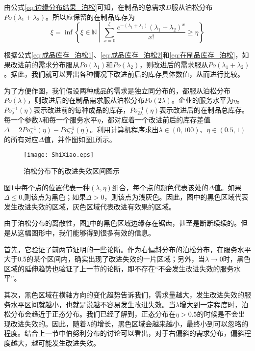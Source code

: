 由公式\ref{eq:边缘分布结果_泊松}可知，在制品的总需求$D$服从泊松分布$Po(\lambda_1+\lambda_2)$。所以应保留的在制品库存为
\begin{equation}
\xi = \inf\left\{\xi\in\mathbb{N}\middle|\sum_{x=0}^{\xi}\frac{e^{-(\lambda_1+\lambda_2)}(\lambda_1+\lambda_2)^x}{x!}\geq \eta\right\}
\label{eq:在制品库存_泊松}
\end{equation}

根据公式\ref{eq:成品库存_泊松1}、\ref{eq:成品库存_泊松2}和\ref{eq:在制品库存_泊松}，如果改进前的需求分布服从$Po(\lambda_1)$和$Po(\lambda_2)$，则改进后的需求服从$Po(\lambda_1+\lambda_2)$。据此，我们就可以算出各种情况下改进前后的库存具体数值，从而进行比较。

为了方便作图，我们假设两种成品的需求是独立同分布的，都服从泊松分布$Po(\lambda)$，则改进后的在制品需求服从泊松分布$Po(2\lambda)$。企业的服务水平为$\eta$。$Po^{-1}_{\lambda}(\eta)$表示改进前的每种成品的库存，$Po^{-1}_{2\lambda}(\eta)$表示改进后的在制品总库存。每一个参数$\lambda$和每一个服务水平$\eta$，都对应着一个改进前后的库存差值$\Delta=2Po^{-1}_{\lambda}(\eta)-Po^{-1}_{2\lambda}(\eta)$。利用计算机程序求出$\lambda\in(0,100)$、$\eta\in(0.5,1)$的所有对应$\Delta$值，并作图如图\ref{fig:泊松分布下的改进失效区间图示}所示。

\begin{figure}[htb]
\centering
\texttt{[image: ShiXiao.eps]}
\caption{泊松分布下的改进失效区间图示}
\label{fig:泊松分布下的改进失效区间图示}
\end{figure}

图\ref{fig:泊松分布下的改进失效区间图示}中每个点的位置代表一种$(\lambda,\eta)$组合，每个点的颜色代表该处的$\Delta$值。如果$\Delta\leq0$,则该点为黑色；如果$\Delta>0$，则该点为浅灰色。因此，图中的黑色区域代表发生改进失效的区域，灰色区域代表改进有效果的区域。

由于泊松分布的离散性，图\ref{fig:泊松分布下的改进失效区间图示}中的黑色区域边缘存在锯齿，甚至是断断续续的。但是从这幅图形中，我们能够得到很多有效的信息。

首先，它验证了前两节证明的一些论断。作为右偏斜分布的泊松分布，在服务水平大于0.5的某个区间内，确实出现了改进失效的一片区域；另外，当$\lambda\to0$时，黑色区域的延伸趋势也验证了上一节的论断，即不存在“不会发生改进失效的服务水平”。

其次，黑色区域在横轴方向的变化趋势告诉我们，需求量越大，发生改进失效的服务水平区间就越小，也就是说越不容易发生改进失效。当$\lambda$增大到一定程度时，泊松分布会趋近于正态分布。我们已经了解到，正态分布在$\eta>0.5$的时候是不会出现改进失效的。因此，随着$\lambda$的增长，黑色区域会越来越小，最终小到可以忽略的程度。结合上一节中伯努利分布的讨论可以看出，对于右偏斜的需求分布，偏斜程度越大，越可能发生改进失效。

